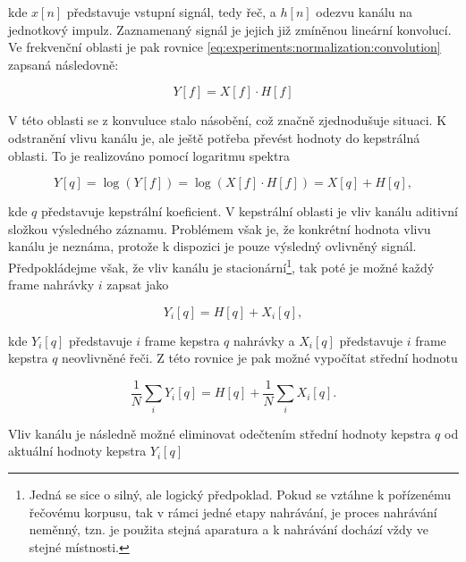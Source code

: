 \noindent kde $x\left[n\right]$ představuje vstupní signál, tedy řeč, a $h\left[n\right]$ odezvu kanálu na jednotkový impulz. Zaznamenaný signál je jejich již zmíněnou lineární konvolucí. Ve frekvenční oblasti je pak rovnice \ref{eq:experiments:normalization:convolution} zapsaná následovně:

\begin{equation}
  Y\left[f\right] = X\left[f\right] \cdot H\left[f\right]
\end{equation}

\noindent V této oblasti se z konvuluce stalo násobění, což značně zjednodušuje situaci. K odstranění vlivu kanálu je, ale ještě potřeba převést hodnoty do kepstrálná oblasti. To je realizováno pomocí logaritmu spektra

\begin{equation}
  Y\left[q\right] = \log\left(Y\left[f\right]\right) = \log\left(X\left[f\right] \cdot H\left[f\right]\right) = X\left[q\right] + H\left[q\right],
\end{equation}

\noindent kde $q$ představuje kepstrální koeficient. V kepstrální oblasti je vliv kanálu aditivní složkou výsledného záznamu. Problémem však je, že konkrétní hodnota vlivu kanálu je neznáma, protože k dispozici je pouze výsledný ovlivněný signál. Předpokládejme však, že vliv kanálu je stacionární\footnote{Jedná se sice o silný, ale logický předpoklad. Pokud se vztáhne k pořízenému řečovému korpusu, tak v rámci jedné etapy nahrávání, je proces nahrávání neměnný, tzn. je použita stejná aparatura a k nahrávání dochází vždy ve stejné místnosti.}, tak poté je možné každý frame nahrávky $i$ zapsat jako

\begin{equation}
  Y_i\left[q\right] = H\left[q\right] + X_i\left[q\right],
\end{equation}

\noindent kde $Y_i\left[q\right]$ představuje $i$ frame kepstra $q$ nahrávky a $X_i\left[q\right]$ představuje $i$ frame kepstra $q$ neovlivněné řeči. Z této rovnice je pak možné vypočítat střední hodnotu

\begin{equation}
  \frac{1}{N} \sum_i Y_i\left[q\right] = H\left[q\right] + \frac{1}{N} \sum_i X_i\left[q\right].
\end{equation}

\noindent Vliv kanálu je následně možné eliminovat odečtením střední hodnoty kepstra $q$ od aktuální hodnoty kepstra $Y_i\left[q\right]$

